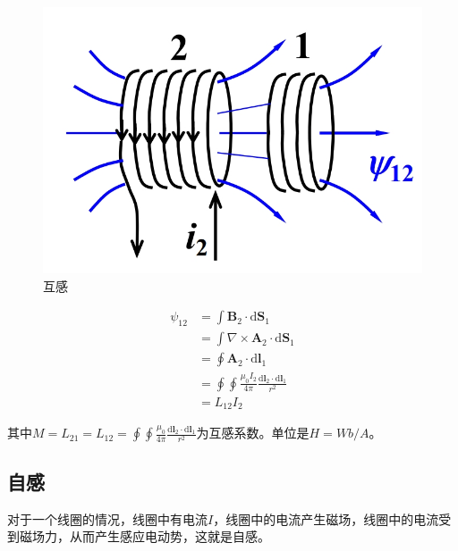 \documentclass[12pt,onecolumn,a4paper]{book}
\numberwithin{table}{subsection}
\numberwithin{equation}{subsection}
\begin{document}
    \begin{figure}[ht]
        \centering
        \includegraphics[scale=0.2]{pic/7.2.1.png}
        \caption{互感}
    \end{figure}

    \begin{align}
        \psi_{12} & = \int \mathbf{B}_2 \cdot \mathrm{d} \mathbf{S}_1                                                      \\
                  & = \int \nabla \times \mathbf{A}_2 \cdot \mathrm{d} \mathbf{S}_1                                        \\
                  & = \oint \mathbf{A}_2 \cdot \mathrm{d} \mathbf{l}_1                                                     \\
                  & = \oint \oint \frac{\mu_0 I_2}{4\pi} \frac{\mathrm{d} \mathbf{l}_2 \cdot \mathrm{d} \mathbf{l}_1}{r^2} \\
                  & = L_{12} I_2
    \end{align}

    其中$M=L_{21}=L_{12}= \oint \oint \frac{\mu_0}{4\pi} \frac{\mathrm{d} \mathbf{l}_2 \cdot \mathrm{d} \mathbf{l}_1}{r^2}$为互感系数。单位是$H=Wb/A$。

    \subsection{自感}

    对于一个线圈的情况，线圈中有电流$I$，线圈中的电流产生磁场，线圈中的电流受到磁场力，从而产生感应电动势，这就是自感。
\end{document}
